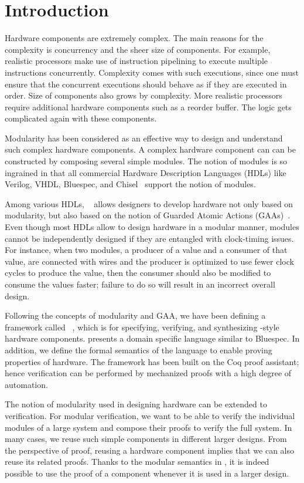 \chapter{Introduction}

Hardware components are extremely complex. The main reasons for the
complexity is concurrency and the sheer size of components. For
example, realistic processors make use of instruction pipelining to
execute multiple instructions concurrently. Complexity comes with such
executions, since one must ensure that the concurrent executions
should behave as if they are executed in order. Size of components
also grows by complexity. More realistic processors require additional
hardware components such as a reorder buffer. The logic gets
complicated again with these components.

Modularity has been considered as an effective way to design and
understand such complex hardware components. A complex hardware
component can can be constructed by composing several simple
modules. The notion of modules is so ingrained in that all commercial
Hardware Description Languages (HDLs) like Verilog, VHDL, Bluespec,
and Chisel~\cite{verilog, vhdl, bsdef, chisel} support the notion of
modules.

Among various HDLs, \Bluespec{}~\cite{bsdef, bsref} allows designers
to develop hardware not only based on modularity, but also based on
the notion of Guarded Atomic Actions (GAAs)~\cite{daniel-gaa}. Even
though most HDLs allow to design hardware in a modular manner, modules
cannot be independently designed if they are entangled with
clock-timing issues. For instance, when two modules, a producer of a
value and a consumer of that value, are connected with wires and the
producer is optimized to use fewer clock cycles to produce the value,
then the consumer should also be modified to consume the values
faster; failure to do so will result in an incorrect overall design.

Following the concepts of modularity and GAA, we have been defining a
framework called \Kami{}~\cite{kami-web, murali-thesis}, which is for
specifying, verifying, and synthesizing \Bluespec{}-style hardware
components. \Kami{} presents a domain specific language similar to
Bluespec. In addition, we define the formal semantics of the \Kami{}
language to enable proving properties of hardware. The framework has
been built on the Coq proof assistant; hence verification can be
performed by mechanized proofs with a high degree of automation.

The notion of modularity used in designing hardware can be extended to
verification. For modular verification, we want to be able to verify
the individual modules of a large system and compose their proofs to
verify the full system. In many cases, we reuse such simple components
in different larger designs. From the perspective of proof, reusing a
hardware component implies that we can also reuse its related
proofs. Thanks to the modular semantics in \Kami{}, it is indeed
possible to use the proof of a component whenever it is used in a
larger design.

